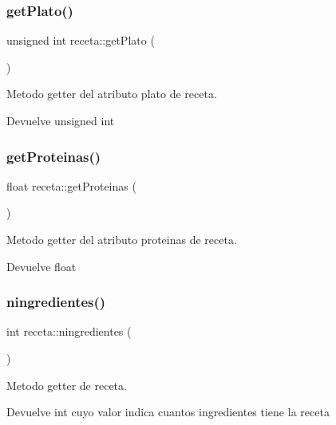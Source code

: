 \subsubsection{\texorpdfstring{get\+Plato()}{getPlato()}}
{\footnotesize\ttfamily unsigned int receta\+::get\+Plato (\begin{DoxyParamCaption}{ }\end{DoxyParamCaption})}



Metodo getter del atributo plato de receta. 

\begin{DoxyReturn}{Devuelve}
unsigned int 
\end{DoxyReturn}
\mbox{\label{classreceta_a801a77ecf009073fd84aae1b0b3dac36}} 
\subsubsection{\texorpdfstring{get\+Proteinas()}{getProteinas()}}
{\footnotesize\ttfamily float receta\+::get\+Proteinas (\begin{DoxyParamCaption}{ }\end{DoxyParamCaption})}



Metodo getter del atributo proteinas de receta. 

\begin{DoxyReturn}{Devuelve}
float 
\end{DoxyReturn}
\mbox{\label{classreceta_a7ab9669bb735e19cdfa1b2fce720bd21}} 
\subsubsection{\texorpdfstring{ningredientes()}{ningredientes()}}
{\footnotesize\ttfamily int receta\+::ningredientes (\begin{DoxyParamCaption}{ }\end{DoxyParamCaption})}



Metodo getter de receta. 

\begin{DoxyReturn}{Devuelve}
int cuyo valor indica cuantos ingredientes tiene la receta 
\end{DoxyReturn}
\mbox{\label{classreceta_a614b0546dc7a6f4458a0f922f08bcaff}} 
